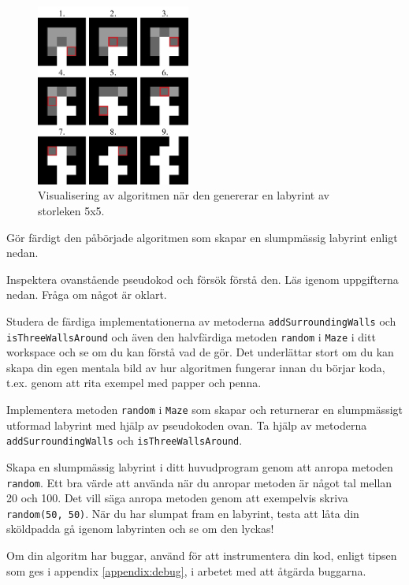 \begin{figure}[H]
	\begin{center}
		\includegraphics[width=0.45\textwidth]{../img/w09-lab/AlgorithmVisualized.png}
	\end{center}
	\caption{Visualisering av algoritmen när den genererar en labyrint av storleken 5x5.}
	\label{lab:maze:prims-algo-viz}
\end{figure}


\Task Gör färdigt den påbörjade algoritmen som skapar en slumpmässig labyrint enligt nedan.

\Subtask Inspektera ovanstående pseudokod och försök förstå den. Läs igenom uppgifterna nedan. Fråga om något är oklart.

\Subtask Studera de färdiga implementationerna av metoderna \texttt{addSurroundingWalls} och \texttt{isThreeWallsAround} och även den halvfärdiga metoden \texttt{random} i \texttt{Maze} i ditt workspace och se om du kan förstå vad de gör. Det underlättar stort om du kan skapa din egen mentala bild av hur algoritmen fungerar innan du börjar koda, t.ex. genom att rita exempel med papper och penna.

\Subtask Implementera metoden \texttt{random} i \texttt{Maze} som skapar och returnerar en slumpmässigt utformad labyrint med hjälp av pseudokoden ovan. Ta hjälp av metoderna \texttt{addSurroundingWalls} och \texttt{isThreeWallsAround}.

\Subtask Skapa en slumpmässig labyrint i ditt huvudprogram genom att anropa metoden \texttt{random}. Ett bra värde att använda när du anropar metoden är något tal mellan 20 och 100. Det vill säga anropa metoden genom att exempelvis skriva \texttt{random(50, 50)}. När du har slumpat fram en labyrint, testa att låta din sköldpadda gå igenom labyrinten och se om den lyckas!

\Subtask Om din algoritm har buggar, använd  för att instrumentera din kod, enligt tipsen som ges i appendix \ref{appendix:debug}, i arbetet med att åtgärda buggarna.

